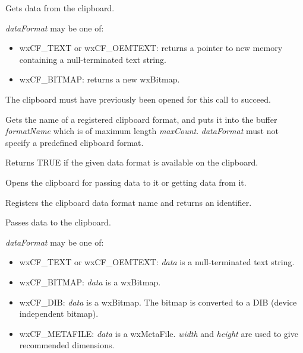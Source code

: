 
Gets data from the clipboard.

{\it dataFormat} may be one of:

\begin{itemize}\itemsep=0pt
\item wxCF\_TEXT or wxCF\_OEMTEXT: returns a pointer to new memory containing a null-terminated text string.
\item wxCF\_BITMAP: returns a new wxBitmap.
\end{itemize}

The clipboard must have previously been opened for this call to succeed.



Gets the name of a registered clipboard format, and puts it into the buffer {\it formatName} which is of maximum
length {\it maxCount}. {\it dataFormat} must not specify a predefined clipboard format.



Returns TRUE if the given data format is available on the clipboard.



Opens the clipboard for passing data to it or getting data from it.



Registers the clipboard data format name and returns an identifier.



Passes data to the clipboard.

{\it dataFormat} may be one of:

\begin{itemize}\itemsep=0pt
\item wxCF\_TEXT or wxCF\_OEMTEXT: {\it data} is a null-terminated text string.
\item wxCF\_BITMAP: {\it data} is a wxBitmap.
\item wxCF\_DIB: {\it data} is a wxBitmap. The bitmap is converted to a DIB (device independent bitmap).
\item wxCF\_METAFILE: {\it data} is a wxMetaFile. {\it width} and {\it height} are used to give recommended dimensions.
\end{itemize}

